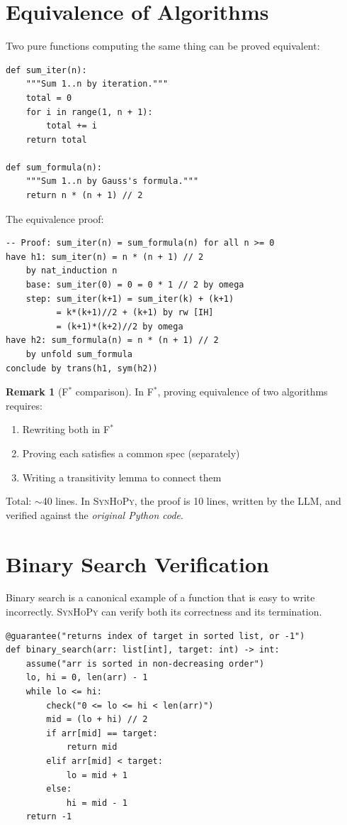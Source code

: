 \documentclass[11pt,a4paper]{report}
\theoremstyle{definition}
\newtheorem{remark}[definition]{Remark}
\theoremstyle{plain}
\newcommand{\fstar}{F$^{*}$}
\newcommand{\synhopy}{\textsc{SynHoPy}}
\begin{document}
\section{Equivalence of Algorithms}

Two pure functions computing the same thing can be proved equivalent:

\begin{lstlisting}[style=synhopy]
def sum_iter(n):
    """Sum 1..n by iteration."""
    total = 0
    for i in range(1, n + 1):
        total += i
    return total

def sum_formula(n):
    """Sum 1..n by Gauss's formula."""
    return n * (n + 1) // 2
\end{lstlisting}

The equivalence proof:
\begin{lstlisting}[style=proof]
-- Proof: sum_iter(n) = sum_formula(n) for all n >= 0
have h1: sum_iter(n) = n * (n + 1) // 2
    by nat_induction n
    base: sum_iter(0) = 0 = 0 * 1 // 2 by omega
    step: sum_iter(k+1) = sum_iter(k) + (k+1)
          = k*(k+1)//2 + (k+1) by rw [IH]
          = (k+1)*(k+2)//2 by omega
have h2: sum_formula(n) = n * (n + 1) // 2
    by unfold sum_formula
conclude by trans(h1, sym(h2))
\end{lstlisting}

\begin{remark}[\fstar{} comparison]
In \fstar{}, proving equivalence of two algorithms requires:
\begin{enumerate}
  \item Rewriting both in \fstar{}
  \item Proving each satisfies a common spec (separately)
  \item Writing a transitivity lemma to connect them
\end{enumerate}
Total: $\sim$40 lines. In \synhopy{}, the proof is 10 lines, written by the LLM,
and verified against the \emph{original Python code}.
\end{remark}


\section{Binary Search Verification}

Binary search is a canonical example of a function that is easy to write
incorrectly. \synhopy{} can verify both its correctness and its termination.

\begin{lstlisting}[style=synhopy]
@guarantee("returns index of target in sorted list, or -1")
def binary_search(arr: list[int], target: int) -> int:
    assume("arr is sorted in non-decreasing order")
    lo, hi = 0, len(arr) - 1
    while lo <= hi:
        check("0 <= lo <= hi < len(arr)")
        mid = (lo + hi) // 2
        if arr[mid] == target:
            return mid
        elif arr[mid] < target:
            lo = mid + 1
        else:
            hi = mid - 1
    return -1
\end{lstlisting}
\end{document}
